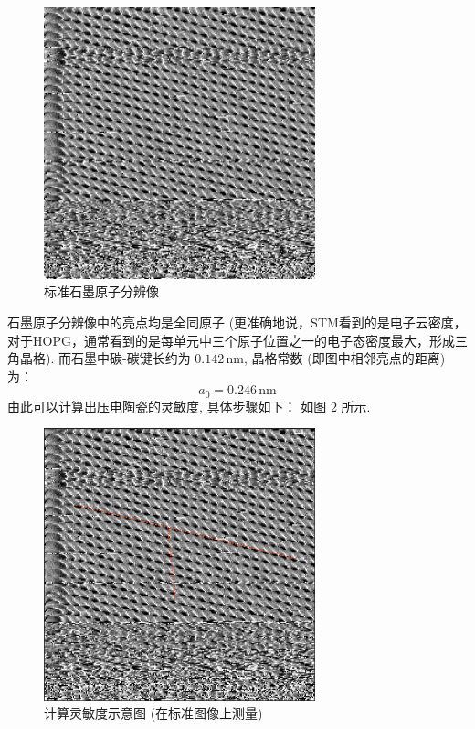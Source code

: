 \documentclass[12pt]{ctexart} %
\begin{document}
\begin{figure}[htbp]
 \centering
 \includegraphics[width=0.7\textwidth]{TI=50;Vb=1000;Vx=4;vy=0.2;gain=20.png} %
 \caption{标准石墨原子分辨像}
 \label{fig:hopg_std}
\end{figure}
石墨原子分辨像中的亮点均是全同原子 (更准确地说，STM看到的是电子云密度，对于HOPG，通常看到的是每单元中三个原子位置之一的电子态密度最大，形成三角晶格). 而石墨中碳-碳键长约为 \( 0.142 \, \text{nm} \), 晶格常数 (即图中相邻亮点的距离) 为：
\[ a_0 = 0.246 \, \text{nm} \] %
由此可以计算出压电陶瓷的灵敏度, 具体步骤如下：
如图 \ref{fig:calibration} 所示.

\begin{figure}[htbp]
 \centering
 \includegraphics[width=0.7\textwidth]{FIG6.png} %
 \caption{计算灵敏度示意图 (在标准图像上测量)}
 \label{fig:calibration}
\end{figure}
\end{document}
